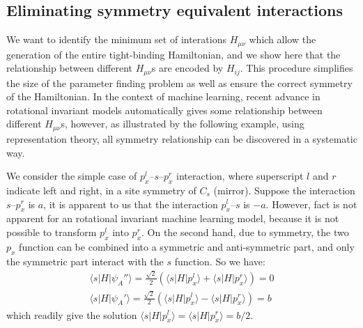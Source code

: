 \documentclass{article}
\begin{document}
\subsection{Eliminating symmetry equivalent interactions}
We want to identify the minimum set of interations $H_{\mu\nu}$ which allow the generation of the entire tight-binding Hamiltonian, and we show 
here that the relationship between different $H_{\mu\nu}$s are encoded by $H_{ij}$. This procedure simplifies the size of 
the parameter finding problem as well as ensure the correct symmetry of the Hamiltonian. In the context of machine learning, recent advance in 
rotational invariant models automatically gives some relationship between different $H_{\mu\nu}$s, however, as illustrated by 
the following example, using representation theory, all symmetry relationship can be discovered in a systematic way. 

We consider the simple case of $p_x^l$--$s$--$p_x^r$ interaction, where superscript $l$ and $r$ indicate left and right, in 
a site symmetry of $C_s$ (mirror). Suppose the interaction $s$--$p_x^r$ is $a$, it is apparent to us that the interaction $p_x^l$--$s$ is $-a$. However,
fact is not apparent for an rotational invariant machine learning model, because it is not possible to transform $p_x^l$
into $p_x^r$. 
On the second hand, due to symmetry, the two $p_x$ function can be combined into a symmetric and anti-symmetric part, and 
only the symmetric part interact with the $s$ function. So we have:
\begin{align}
    \label{E:px_s_AO_MO}
    \langle s | H | \psi_A'' \rangle = \frac{\sqrt{2}}{2} \left( \langle s | H | p_x^l \rangle + \langle s | H | p_x^r \rangle\right) = 0 \\
    \langle s | H | \psi_A' \rangle = \frac{\sqrt{2}}{2} \left( \langle s | H | p_x^l \rangle - \langle s | H | p_x^r \rangle\right) = b
\end{align}
which readily give the solution  $\langle s | H | p_x^l \rangle = \langle s | H | p_x^r \rangle = b/2$. 
\end{document}
